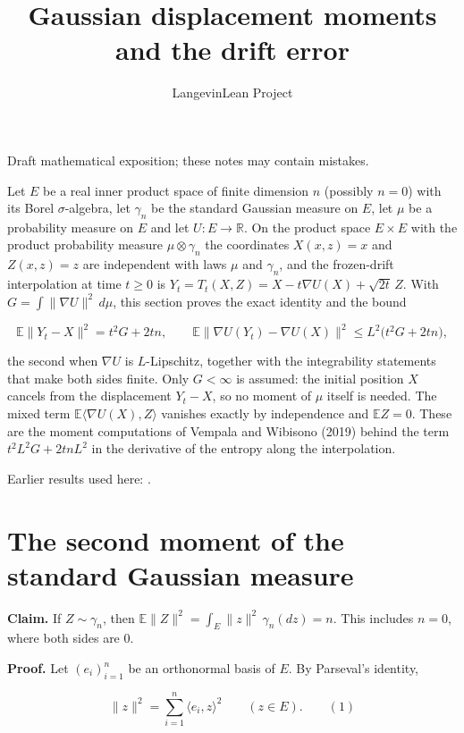 \documentclass[11pt,a4paper]{article}
\title{\texorpdfstring{Gaussian displacement moments and the drift error}{Gaussian displacement moments and the drift error}}
\author{LangevinLean Project}
\date{}
\begin{document}
\maketitle
Draft mathematical exposition; these notes may contain mistakes.


Let \(E\) be a real inner product space of finite dimension \(n\) (possibly \(n=0\)) with its Borel \(\sigma\)-algebra, let \(\gamma_n\) be the standard Gaussian measure on \(E\), let \(\mu\) be a probability measure on \(E\) and let \(U:E\to\mathbb R\). On the product space \(E\times E\) with the product probability measure \(\mu\otimes\gamma_n\) the coordinates \(X(x,z)=x\) and \(Z(x,z)=z\) are independent with laws \(\mu\) and \(\gamma_n\), and the frozen-drift interpolation at time \(t\ge0\) is \(Y_t=T_t(X,Z)=X-t\nabla U(X)+\sqrt{2t}\,Z\). With \(G=\int\|\nabla U\|^2\,d\mu\), this section proves the exact identity and the bound


\[\mathbb E\|Y_t-X\|^2=t^2G+2tn,\qquad \mathbb E\|\nabla U(Y_t)-\nabla U(X)\|^2\le L^2\bigl(t^2G+2tn\bigr),\]


the second when \(\nabla U\) is \(L\)-Lipschitz, together with the integrability statements that make both sides finite. Only \(G<\infty\) is assumed: the initial position \(X\) cancels from the displacement \(Y_t-X\), so no moment of \(\mu\) itself is needed. The mixed term \(\mathbb E\langle\nabla U(X),Z\rangle\) vanishes exactly by independence and \(\mathbb EZ=0\). These are the moment computations of Vempala and Wibisono (2019) behind the term \(t^2L^2G+2tnL^2\) in the derivative of the entropy along the interpolation.



Earlier results used here: \cite[Section~3.36]{LangevinLean2026ULASC}.

\section{\texorpdfstring{The second moment of the standard Gaussian measure}{The second moment of the standard Gaussian measure}}


\textbf{Claim.} If \(Z\sim\gamma_n\), then \(\mathbb E\|Z\|^2=\int_E\|z\|^2\,\gamma_n(dz)=n\). This includes \(n=0\), where both sides are \(0\).




\textbf{Proof.} Let \((e_i)_{i=1}^n\) be an orthonormal basis of \(E\). By Parseval's identity,


\[\|z\|^2=\sum_{i=1}^n\langle e_i,z\rangle^2\qquad(z\in E).\qquad(1)\]
\end{document}
